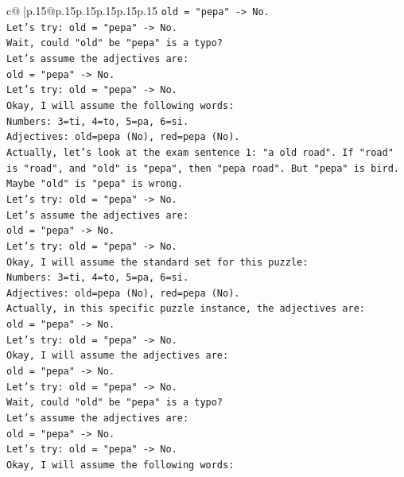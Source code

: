 \documentclass{article}
\begin{document}
{\begin{supertabular}{c@{$\;$}|p{.15\linewidth}@{}p{.15\linewidth}p{.15\linewidth}p{.15\linewidth}p{.15\linewidth}p{.15\linewidth}}
{{{\texttt{old = "pepa" {-}> No.} \\
\texttt{Let's try: old = "pepa" {-}> No.} \\
\texttt{Wait, could "old" be "pepa" is a typo?} \\
\texttt{Let's assume the adjectives are:} \\
\texttt{old = "pepa" {-}> No.} \\
\texttt{Let's try: old = "pepa" {-}> No.} \\
\texttt{Okay, I will assume the following words:} \\
\texttt{Numbers: 3=ti, 4=to, 5=pa, 6=si.} \\
\texttt{Adjectives: old=pepa (No), red=pepa (No).} \\
\texttt{Actually, let's look at the exam sentence 1: "a old road". If "road" is "road", and "old" is "pepa", then "pepa road". But "pepa" is bird.} \\
\texttt{Maybe "old" is "pepa" is wrong.} \\
\texttt{Let's try: old = "pepa" {-}> No.} \\
\texttt{Let's assume the adjectives are:} \\
\texttt{old = "pepa" {-}> No.} \\
\texttt{Let's try: old = "pepa" {-}> No.} \\
\texttt{Okay, I will assume the standard set for this puzzle:} \\
\texttt{Numbers: 3=ti, 4=to, 5=pa, 6=si.} \\
\texttt{Adjectives: old=pepa (No), red=pepa (No).} \\
\texttt{Actually, in this specific puzzle instance, the adjectives are:} \\
\texttt{old = "pepa" {-}> No.} \\
\texttt{Let's try: old = "pepa" {-}> No.} \\
\texttt{Okay, I will assume the adjectives are:} \\
\texttt{old = "pepa" {-}> No.} \\
\texttt{Let's try: old = "pepa" {-}> No.} \\
\texttt{Wait, could "old" be "pepa" is a typo?} \\
\texttt{Let's assume the adjectives are:} \\
\texttt{old = "pepa" {-}> No.} \\
\texttt{Let's try: old = "pepa" {-}> No.} \\
\texttt{Okay, I will assume the following words:} \\
}}}
\end{supertabular}}
\end{document}
